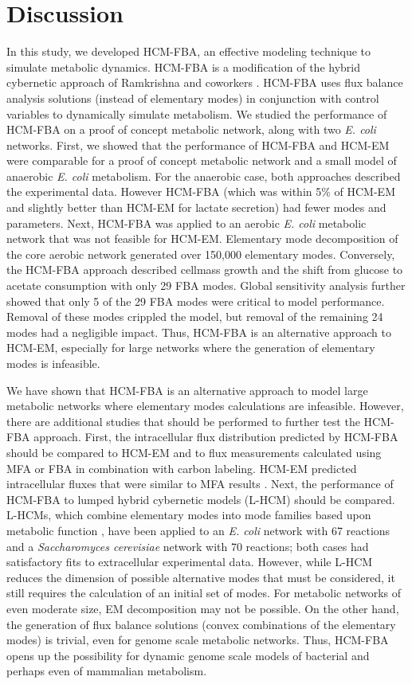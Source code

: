 \documentclass[10pt,twocolumn,twoside,final]{IEEEtran}
\begin{document}
\section{Discussion}
In this study, we developed HCM-FBA, an effective modeling technique to simulate metabolic dynamics.
HCM-FBA is a modification of the hybrid cybernetic approach of Ramkrishna and coworkers \cite{2008_kim_varner_ramkrishna_BiotechProg}.
HCM-FBA uses flux balance analysis solutions (instead of elementary modes) in conjunction with control variables to dynamically simulate metabolism.
We studied the performance of HCM-FBA on a proof of concept metabolic network, along with two \emph{E. coli} networks.
First, we showed that the performance of HCM-FBA and HCM-EM were comparable for a proof of concept metabolic network and a small model of anaerobic \textit{E. coli} metabolism.
For the anaerobic case, both approaches described the experimental data.
However HCM-FBA (which was within 5\% of HCM-EM and slightly better than HCM-EM for lactate secretion) had fewer modes and parameters.
Next, HCM-FBA was applied to an aerobic \textit{E. coli} metabolic network that was not feasible for HCM-EM.
Elementary mode decomposition of the core aerobic network generated over 150,000 elementary modes.
Conversely, the HCM-FBA approach described cellmass growth and the shift from glucose to acetate consumption with only 29 FBA modes.
Global sensitivity analysis further showed that only 5 of the 29 FBA modes were critical to model performance.
Removal of these modes crippled the model, but removal of the remaining 24 modes had a negligible impact.
Thus, HCM-FBA is an alternative approach to HCM-EM, especially for large networks where the generation of elementary modes is infeasible.

We have shown that HCM-FBA is an alternative approach to model large metabolic networks where elementary modes calculations are infeasible.
However, there are additional studies that should be performed to further test the HCM-FBA approach.
First, the intracellular flux distribution predicted by HCM-FBA should be compared to HCM-EM and to flux measurements calculated using MFA or FBA in combination with carbon labeling.
HCM-EM predicted intracellular fluxes that were similar to MFA results \cite{2008_kim_varner_ramkrishna_BiotechProg}.
Next, the performance of HCM-FBA to lumped hybrid cybernetic models (L-HCM) should be compared.
L-HCMs, which combine elementary modes into mode families based upon metabolic function \cite{2010_song,Song:2011aa},
have been applied to an \textit{E. coli} network with 67 reactions and a \textit{Saccharomyces cerevisiae} network with 70 reactions;
both cases had satisfactory fits to extracellular experimental data.
However, while L-HCM reduces the dimension of possible alternative modes that must be considered, it still requires the calculation of an initial set of modes.
For metabolic networks of even moderate size, EM decomposition may not be possible.
On the other hand, the generation of flux balance solutions (convex combinations of the elementary modes) is trivial, even for genome scale metabolic networks.
Thus, HCM-FBA opens up the possibility for dynamic genome scale models of bacterial and perhaps even of mammalian metabolism.
\end{document}
